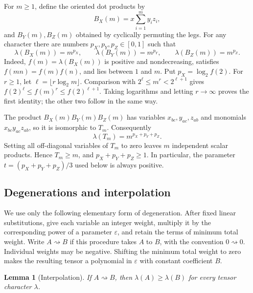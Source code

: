 \documentclass[11pt]{article}
\newtheorem{lemma}[theorem]{Lemma}
\theoremstyle{definition}
\theoremstyle{remark}
\newcommand{\degen}{\mathrel{\rightsquigarrow}}
\newcommand{\eps}{\varepsilon}
\numberwithin{equation}{section}
\begin{document}
For $m\geq1$, define the oriented dot products by
\[
 B_X(m)=x\sum_{i=1}^m y_i z_i,
\]
and $B_Y(m),B_Z(m)$ obtained by cyclically permuting the legs.
For any character there are numbers $p_X,p_Y,p_Z\in[0,1]$ such that
\begin{equation}\label{eq:dot}
 \lambda(B_X(m))=m^{p_X},\qquad
 \lambda(B_Y(m))=m^{p_Y},\qquad
 \lambda(B_Z(m))=m^{p_Z}.
\end{equation}
Indeed, $f(m)=\lambda(B_X(m))$ is positive and nondecreasing, satisfies
$f(mn)=f(m)f(n)$, and lies between $1$ and $m$. Put $p_X=\log_2 f(2)$.
For $r\geq1$, let $\ell=\lfloor r\log_2m\rfloor$. Comparison with
$2^\ell\leq m^r<2^{\ell+1}$ gives
$f(2)^\ell\leq f(m)^r\leq f(2)^{\ell+1}$.
Taking logarithms and letting $r\to\infty$ proves the first identity;
the other two follow in the same way.

The product $B_X(m)B_Y(m)B_Z(m)$ has variables $x_{bc},y_{ac},z_{ab}$
and monomials $x_{bc}y_{ac}z_{ab}$, so it is isomorphic to $T_m$.
Consequently
\begin{equation}\label{eq:character-mm}
 \lambda(T_m)=m^{p_X+p_Y+p_Z}.
\end{equation}
Setting all off-diagonal variables of $T_m$ to zero leaves $m$
independent scalar products. Hence $T_m\geq m$, and
$p_X+p_Y+p_Z\geq1$. In particular, the parameter
$t=(p_X+p_Y+p_Z)/3$ used below is always positive.

\subsection{Degenerations and interpolation}

We use only the following elementary form of degeneration. After fixed
linear substitutions, give each variable an integer weight, multiply
it by the corresponding power of a parameter $\eps$, and retain the
terms of minimum total weight. Write $A\degen B$ if this procedure
takes $A$ to $B$, with the convention $0\degen0$.
Individual weights may be negative. Shifting the
minimum total weight to zero makes the resulting tensor a polynomial
in $\eps$ with constant coefficient $B$.

\begin{lemma}[Interpolation]\label{lem:interpolation}
If $A\degen B$, then $\lambda(A)\geq\lambda(B)$ for every tensor
character $\lambda$.
\end{lemma}
\end{document}
